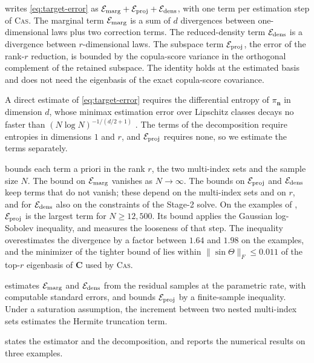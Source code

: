 \documentclass[review,hidelinks,onefignum,onetabnum]{siamart251216}
\newcommand{\mC}{\bm{C}}
\newcommand{\vn}{\bm{n}}
\begin{document}
 writes \eqref{eq:target-error} as $\mathcal E_{\rm marg} + \mathcal E_{\rm proj} + \mathcal E_{\rm dens}$, with one term per estimation step of \textsc{Cas}. The marginal term $\mathcal E_{\rm marg}$ is a sum of $d$ divergences between one-dimensional laws plus two correction terms. The reduced-density term $\mathcal E_{\rm dens}$ is a divergence between $r$-dimensional laws. The subspace term $\mathcal E_{\rm proj}$, the error of the rank-$r$ reduction, is bounded by the copula-score variance in the orthogonal complement of the retained subspace. The identity holds at the estimated basis and does not need the eigenbasis of the exact copula-score covariance.

A direct estimate of \eqref{eq:target-error} requires the differential entropy of $\pi_{\vn}$ in dimension $d$, whose minimax estimation error over Lipschitz classes decays no faster than $(N\log N)^{-1/(d/2+1)}$ \cite[Thm.~1]{HanJiaoWeissmanWu2020}. The terms of the decomposition require entropies in dimensions $1$ and $r$, and $\mathcal E_{\rm proj}$ requires none, so we estimate the terms separately.

 bounds each term a priori in the rank $r$, the two multi-index sets and the sample size $N$. The bound on $\mathcal E_{\rm marg}$ vanishes as $N \to \infty$. The bounds on $\mathcal E_{\rm proj}$ and $\mathcal E_{\rm dens}$ keep terms that do not vanish; these depend on the multi-index sets and on $r$, and for $\mathcal E_{\rm dens}$ also on the constraints of the Stage-2 solve. On the examples of , $\mathcal E_{\rm proj}$ is the largest term for $N \ge 12{,}500$. Its bound applies the Gaussian log-Sobolev inequality, and  measures the looseness of that step. The inequality overestimates the divergence by a factor between $1.64$ and $1.98$ on the examples, and the minimizer of the tighter bound of \cite{LiCuiLiMarzoukZahm2024sharp} lies within $\|\sin\Theta\|_F \le 0.011$ of the top-$r$ eigenbasis of $\mC$ used by \textsc{Cas}.

 estimates $\mathcal E_{\rm marg}$ and $\mathcal E_{\rm dens}$ from the residual samples at the parametric rate, with computable standard errors, and bounds $\mathcal E_{\rm proj}$ by a finite-sample inequality. Under a saturation assumption, the increment between two nested multi-index sets estimates the Hermite truncation term.

 states the estimator and the decomposition, and  reports the numerical results on three examples.
\end{document}
